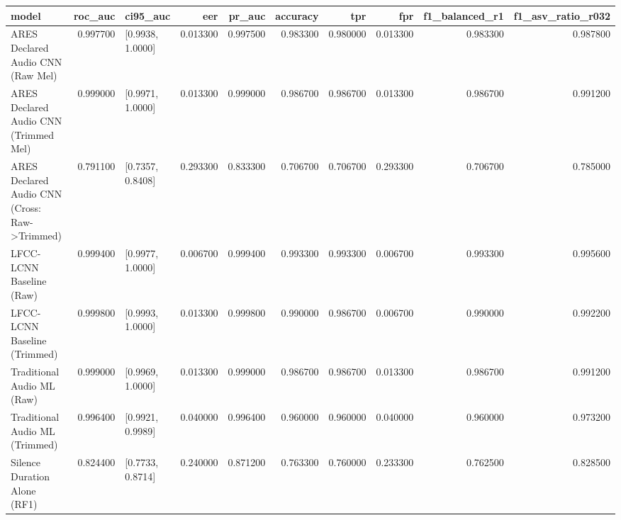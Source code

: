 \begin{tabular}{lrlrrrrrrr}
\toprule
model & roc_auc & ci95_auc & eer & pr_auc & accuracy & tpr & fpr & f1_balanced_r1 & f1_asv_ratio_r032 \\
\midrule
ARES Declared Audio CNN (Raw Mel) & 0.997700 & [0.9938, 1.0000] & 0.013300 & 0.997500 & 0.983300 & 0.980000 & 0.013300 & 0.983300 & 0.987800 \\
ARES Declared Audio CNN (Trimmed Mel) & 0.999000 & [0.9971, 1.0000] & 0.013300 & 0.999000 & 0.986700 & 0.986700 & 0.013300 & 0.986700 & 0.991200 \\
ARES Declared Audio CNN (Cross: Raw->Trimmed) & 0.791100 & [0.7357, 0.8408] & 0.293300 & 0.833300 & 0.706700 & 0.706700 & 0.293300 & 0.706700 & 0.785000 \\
LFCC-LCNN Baseline (Raw) & 0.999400 & [0.9977, 1.0000] & 0.006700 & 0.999400 & 0.993300 & 0.993300 & 0.006700 & 0.993300 & 0.995600 \\
LFCC-LCNN Baseline (Trimmed) & 0.999800 & [0.9993, 1.0000] & 0.013300 & 0.999800 & 0.990000 & 0.986700 & 0.006700 & 0.990000 & 0.992200 \\
Traditional Audio ML (Raw) & 0.999000 & [0.9969, 1.0000] & 0.013300 & 0.999000 & 0.986700 & 0.986700 & 0.013300 & 0.986700 & 0.991200 \\
Traditional Audio ML (Trimmed) & 0.996400 & [0.9921, 0.9989] & 0.040000 & 0.996400 & 0.960000 & 0.960000 & 0.040000 & 0.960000 & 0.973200 \\
Silence Duration Alone (RF1) & 0.824400 & [0.7733, 0.8714] & 0.240000 & 0.871200 & 0.763300 & 0.760000 & 0.233300 & 0.762500 & 0.828500 \\
\bottomrule
\end{tabular}
